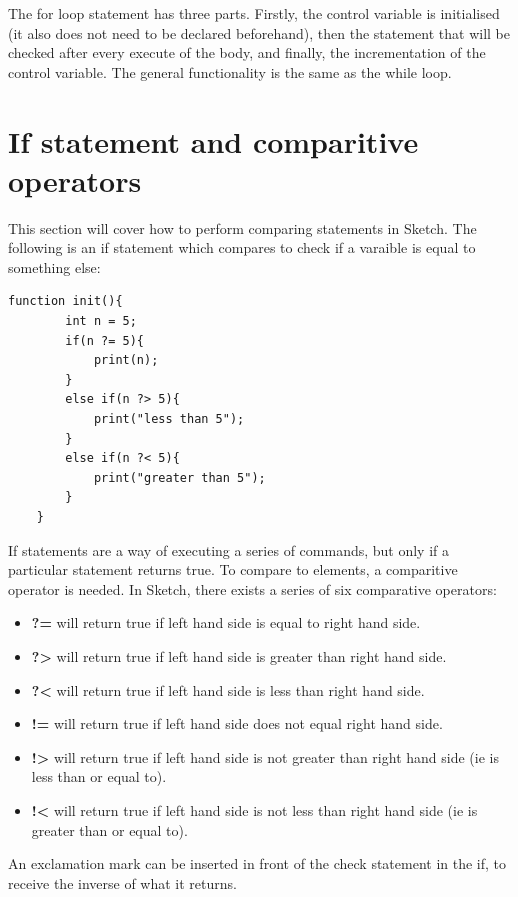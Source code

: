 \documentclass{l3proj}
\begin{document}
The for loop statement has three parts. Firstly, the control variable is initialised (it also does not need to be declared beforehand), then the statement that will be checked after every execute of the body, and finally, the incrementation of the control variable. The general functionality is the same as the while loop.
\section{If statement and comparitive operators}
\label{comp}
This section will cover how to perform comparing statements in Sketch. The following is an if statement which compares to check if a varaible is equal to something else:
\begin{lstlisting}[caption={If-Else Conditionals},label={lst:tutorial-ifelse}]
    function init(){
        int n = 5;
        if(n ?= 5){
            print(n);
        }
        else if(n ?> 5){
            print("less than 5");
        }
        else if(n ?< 5){
            print("greater than 5");
        }
    }
\end{lstlisting}
If statements are a way of executing a series of commands, but only if a particular statement returns true. To compare to elements, a comparitive operator is needed. In Sketch, there exists a series of six comparative operators:
\begin{itemize}
\item \textbf{?=} will return true if left hand side is equal to right hand side.
\item \textbf{?\textgreater} will return true if left hand side is greater than right hand side.
\item \textbf{?\textless} will return true if left hand side is less than right hand side.
\item \textbf{!=} will return true if left hand side does not equal right hand side.
\item \textbf{!\textgreater} will return true if left hand side is not greater than right hand side (ie is less than or equal to).
\item \textbf{!\textless} will return true if left hand side is not less than right hand side (ie is greater than or equal to).
\end{itemize}
An exclamation mark can be inserted in front of the check statement in the if, to receive the inverse of what it returns.
\end{document}
